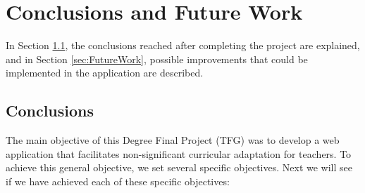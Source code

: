 \chapter{Conclusions and Future Work}
\label{cap:conclusions}


In Section \ref{sec:conclusions}, the conclusions reached after completing the project are explained, and in Section \ref{sec:FutureWork}, possible improvements that could be implemented in the application are described.

\section{Conclusions}
\label{sec:conclusions}
The main objective of this Degree Final Project (TFG) was to develop a web application that facilitates non-significant curricular adaptation for teachers. To achieve this general objective, we set several specific objectives. Next we will see if we have achieved each of these specific objectives:

